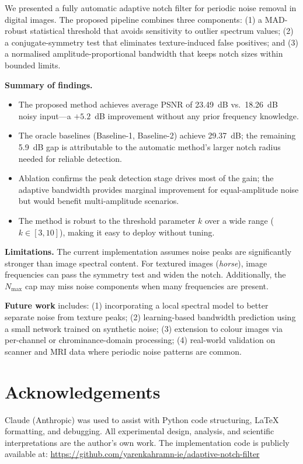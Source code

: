 \documentclass[conference,a4paper]{IEEEtran}
\begin{document}
We presented a fully automatic adaptive notch filter for periodic noise removal in digital images. The proposed pipeline combines three components: (1) a MAD-robust statistical threshold that avoids sensitivity to outlier spectrum values; (2) a conjugate-symmetry test that eliminates texture-induced false positives; and (3) a normalised amplitude-proportional bandwidth that keeps notch sizes within bounded limits.

\textbf{Summary of findings.}
\begin{itemize}
  \item The proposed method achieves average PSNR of 23.49~dB vs.\ 18.26~dB noisy input—a $+5.2$~dB improvement without any prior frequency knowledge.
  \item The oracle baselines (Baseline-1, Baseline-2) achieve 29.37~dB; the remaining 5.9~dB gap is attributable to the automatic method's larger notch radius needed for reliable detection.
  \item Ablation confirms the peak detection stage drives most of the gain; the adaptive bandwidth provides marginal improvement for equal-amplitude noise but would benefit multi-amplitude scenarios.
  \item The method is robust to the threshold parameter $k$ over a wide range ($k \in [3,10]$), making it easy to deploy without tuning.
\end{itemize}

\textbf{Limitations.} The current implementation assumes noise peaks are significantly stronger than image spectral content. For textured images (\textit{horse}), image frequencies can pass the symmetry test and widen the notch. Additionally, the $N_\text{max}$ cap may miss noise components when many frequencies are present.

\textbf{Future work} includes: (1) incorporating a local spectral model to better separate noise from texture peaks; (2) learning-based bandwidth prediction using a small network trained on synthetic noise; (3) extension to colour images via per-channel or chrominance-domain processing; (4) real-world validation on scanner and MRI data where periodic noise patterns are common.

\section*{Acknowledgements}

Claude (Anthropic) was used to assist with Python code structuring, LaTeX formatting, and debugging. All experimental design, analysis, and scientific interpretations are the author's own work. The implementation code is publicly available at: \url{https://github.com/yarenkahramn-ie/adaptive-notch-filter}
\end{document}
